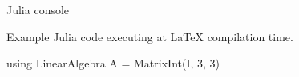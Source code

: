 \begin{frame}[fragile]{Julia console}

Example Julia code executing at LaTeX compilation time. %

\begin{juliaconsole}
using LinearAlgebra
A = Matrix{Int}(I, 3, 3)
\end{juliaconsole}

\end{frame}